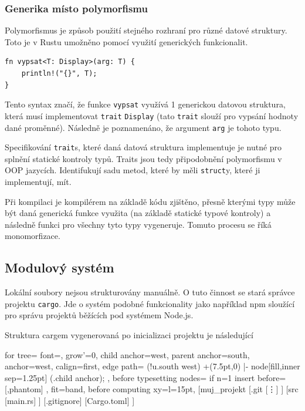 \documentclass[a4paper, 12pt, twoside]{article} %
\begin{document}
		\subsubsection{Generika místo polymorfismu}
			Polymorfismus je způsob použití stejného rozhraní pro různé datové struktury. Toto je v Rustu umožněno pomocí využití generických funkcionalit.
			\begin{verbatim}
fn vypsat<T: Display>(arg: T) {
	println!("{}", T);
}
			\end{verbatim}
			
			Tento syntax značí, že funkce \texttt{vypsat} využívá 1 generickou datovou struktura, která musí implementovat \texttt{trait} \texttt{Display} (tato \texttt{trait} slouží pro vypsání hodnoty dané proměnné). Následně je poznamenáno, že argument \texttt{arg} je tohoto typu.
			
			Specifikování \texttt{trait}s, které daná datová struktura implementuje je nutné pro splnění statické kontroly typů. Traits jsou tedy připodobnění polymorfismu v OOP jazycích. Identifukují sadu metod, které by měli \texttt{struct}y, které ji implementují, mít.
			
			Při kompilaci je kompilérem na základě kódu zjištěno, přesně kterými typy může být daná generická funkce využita (na základě statické typové kontroly) a následně funkci pro všechny tyto typy vygeneruje. Tomuto procesu se říká monomorfizace.

	\subsection{Modulový systém}
		Lokální soubory nejsou strukturovány manuálně. O tuto činnost se stará správce projektu \texttt{cargo}. Jde o systém podobné funkcionality jako například npm sloužící pro správu projektů běžících pod systémem Node.js.
		
		Struktura cargem vygenerovaná po inicializaci projektu je následující
		\begin{center}
			\begin{forest}
				for tree={
				font=\ttfamily,
				grow'=0,
				child anchor=west,
				parent anchor=south,
				anchor=west,
				calign=first,
				edge path={
					\noexpand{}
					(!u.south west) +(7.5pt,0) |- node[fill,inner sep=1.25pt] {} (.child anchor);
				},
				before typesetting nodes={
					if n=1
					{insert before={[,phantom]}}
					{}
				},
				fit=band,
				before computing xy={l=15pt},
				}
			[muj\_projekt
				[.git
					[\vdots]
				]
				[src
					[main.rs]
				]
				[.gitignore]
				[Cargo.toml]
			]
			\end{forest}
		\end{center}
		
\end{document}
